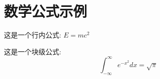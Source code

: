 \documentclass{article}
\begin{document}
\section{数学公式示例}

这是一个行内公式: $E = mc^2$

这是一个块级公式:
\begin{equation}
\int_{-\infty}^{\infty} e^{-x^2} dx = \sqrt{\pi}
\end{equation}
\end{document}
